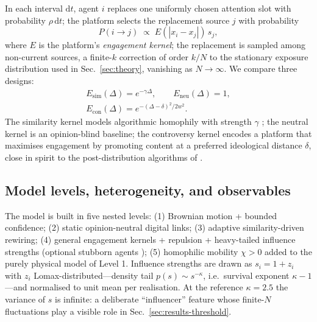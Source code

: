 \documentclass[5p,times,twocolumn]{elsarticle}
\newcommand{\dd}{\mathrm{d}}
\begin{document}
In each interval $\dd t$, agent $i$ replaces one uniformly chosen attention
slot with probability $\rho\,\dd t$; the platform selects the replacement
source $j$ with probability
\begin{equation}
  P(i \to j) \;\propto\; E\!\left(|x_i - x_j|\right)\, s_j,
  \label{eq:rewire}
\end{equation}
where $E$ is the platform's \emph{engagement kernel}; the replacement is
sampled among non-current sources, a finite-$k$ correction of order $k/N$
to the stationary exposure distribution used in Sec.~\ref{sec:theory},
vanishing as $N \to \infty$. We compare three designs:
\begin{equation}
  \begin{gathered}
  E_{\mathrm{sim}}(\Delta) = e^{-\gamma \Delta},
  \qquad
  E_{\mathrm{neu}}(\Delta) = 1,
  \\
  E_{\mathrm{con}}(\Delta) = e^{-(\Delta - \delta)^2 / 2 w^2}.
  \end{gathered}
  \label{eq:engagement}
\end{equation}
The similarity kernel models algorithmic homophily with strength $\gamma$
\citep{sirbu2019, santos2021}; the neutral kernel is an opinion-blind
baseline; the controversy kernel encodes a platform that maximises
engagement by promoting content at a preferred ideological distance
$\delta$, close in spirit to the post-distribution algorithms of
\citet{dearruda2022}.

\subsection{Model levels, heterogeneity, and observables}

The model is built in five nested levels: (1) Brownian motion + bounded
confidence; (2) static opinion-neutral digital links; (3) adaptive
similarity-driven rewiring; (4) general engagement kernels + repulsion +
heavy-tailed influence strengths (optional stubborn agents
\citep{tian2018}); (5) homophilic mobility $\chi > 0$ added to the purely
physical model of Level 1. Influence
strengths are drawn as $s_i = 1 + z_i$ with $z_i$
Lomax-distributed---density tail $p(s) \sim s^{-\kappa}$, i.e.\ survival
exponent $\kappa - 1$---and normalised to unit mean per realisation. At
the reference $\kappa = 2.5$ the variance of $s$ is infinite: a
deliberate ``influencer'' feature whose finite-$N$ fluctuations play a
visible role in Sec.~\ref{sec:results-threshold}.
\end{document}

